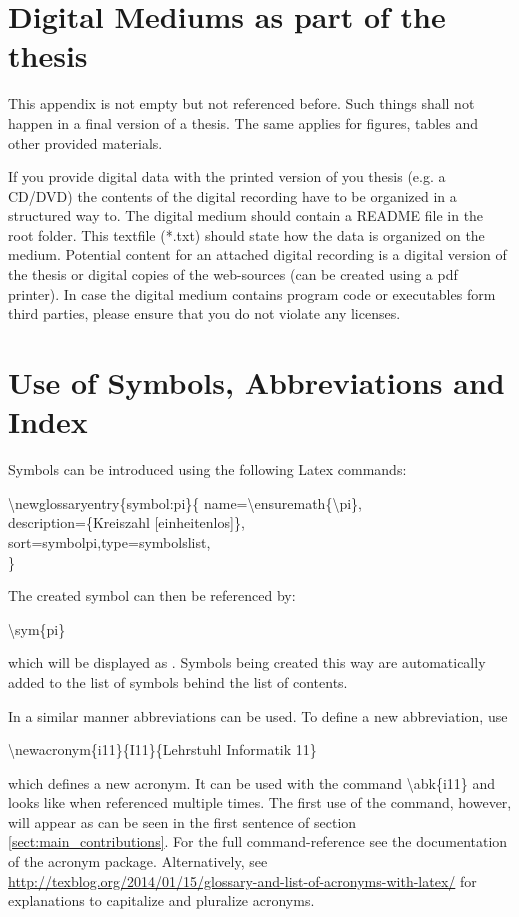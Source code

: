 \chapter{Digital Mediums as part of the thesis}
\label{app:b}

This appendix is not empty but not referenced before.
Such things shall not happen in a final version of a thesis.
The same applies for figures, tables and other provided materials.

If you provide digital data with the printed version of you thesis (e.g. a CD/DVD) the contents of the digital recording have to be organized in a structured way to.
The digital medium should contain a README file in the root folder.
This textfile (*.txt) should state how the data is organized on the medium.
Potential content for an attached digital recording is a digital version of the thesis or digital copies of the web-sources (can be created using a pdf printer).
In case the digital medium contains program code or executables form third parties, please ensure that you do not violate any licenses.

\chapter{Use of Symbols, Abbreviations and Index}
\label{app:c}

Symbols can be introduced using the following Latex commands:
\begin{flushleft}
\textbackslash newglossaryentry\{symbol:pi\}\{
	name=\textbackslash ensuremath\{\textbackslash pi\},\\
	description=\{Kreiszahl [einheitenlos]\},\\
	sort=symbolpi,type=symbolslist,\\
\}
\end{flushleft}

The created symbol can then be referenced by:
\begin{flushleft}
\textbackslash sym\{pi\}
\end{flushleft}
which will be displayed as .
Symbols being created this way are automatically added to the list of symbols behind the list of contents.


In a similar manner abbreviations can be used.
To define a new abbreviation, use
\begin{flushleft}
\textbackslash newacronym\{i11\}\{I11\}\{Lehrstuhl Informatik 11\}
\end{flushleft}
which defines a new acronym.
It can be used with the command \textbackslash abk\{i11\} and looks like  when referenced multiple times.
The first use of the command, however, will appear as can be seen in the first sentence of section \ref{sect:main_contributions}.
For the full command-reference see the documentation of the acronym package.
Alternatively, see \url{http://texblog.org/2014/01/15/glossary-and-list-of-acronyms-with-latex/} for explanations to capitalize and pluralize acronyms.


